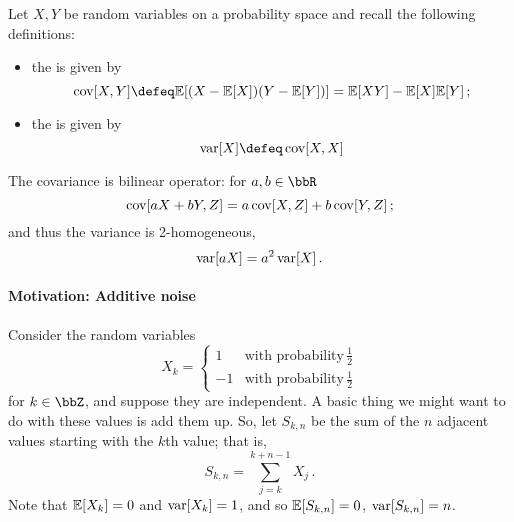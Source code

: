 \documentclass[../../../Master/AppliedStochastics.tex]{subfiles}
\author{Maya}
\date{24 September 2018}
\begin{document}
%


\makelecture


Let $X, Y$ be random variables on a probability space
    and recall the following definitions:


\begin{itemize}
    \item the  is given by
    \begin{equation*}
        \cov[X, Y] \defeq \E[(X - \E[X]) (Y - \E[Y])]
                     =   \E[X Y] - \E[X] \E[Y]\,;
    \end{equation*}
    
    \item the  is given by
    \begin{equation*}
        \var[X] \defeq \cov[X, X]
    \end{equation*}
\end{itemize}


\noindent
The covariance is bilinear operator:
    for $a, b \in \bbR$
\begin{equation*}
    \operatorname{cov}[a X + b Y, Z] = a \operatorname{cov}[X, Z] + b\operatorname{cov}[Y, Z]\,;
\end{equation*}
    and thus the variance is 2-homogeneous,
\begin{equation*}
    \operatorname{var}[a X] = a^2\operatorname{var}[X]\,.
\end{equation*}


\paragraph{Motivation: Additive noise}


Consider the random variables
\begin{equation*}
    X_k = \begin{cases}
            1 & \text{with probability}\, \frac{1}{2} \\
           -1 & \text{with probability}\, \frac{1}{2}
          \end{cases}
\end{equation*}
    for $k \in \bbZ$, and suppose they are independent.
A basic thing we might want to do with these values is add them up.
So, let $S_{k, n}$ be the sum of the $n$ adjacent values
    starting with the $k$th value; that is,
\begin{equation*}
    S_{k, n} = \sum_{j = k}^{k + n - 1} X_j\,.
\end{equation*}
Note that $\mathbb{E}[X_k] = 0$ and $\operatorname{var}[X_k] = 1$,
    and so $\mathbb{E}[S_{k, n}] = 0$, $\operatorname{var}[S_{k, n}] = n$.
\end{document}
